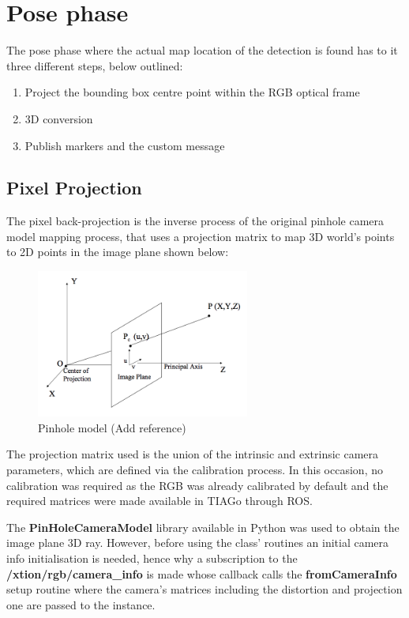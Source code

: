\section{Pose phase}

The pose phase where the actual map location of the detection is found has to it three different steps, below outlined:

\begin{enumerate}
  \item Project the bounding box centre point within the RGB optical frame
  \item 3D conversion 
  \item Publish markers and the custom message
\end{enumerate}

\subsection{Pixel Projection}

The pixel back-projection is the inverse process of the original pinhole camera model mapping process, that uses a projection matrix to map 3D world's points to 2D points in the image plane shown below:

\begin{figure}[!htbp]
\begin{center}
\includegraphics[width=7cm]{images/chapter4_pinhole_model.png}
\end{center}
\caption{Pinhole model (Add reference)}
\label{fig:pinhole}
\end{figure}

The projection matrix used is the union of the intrinsic and extrinsic camera parameters, which are defined via the calibration process. In this occasion, no calibration was required as the RGB was already calibrated by default and the required matrices were made available in TIAGo through ROS.

The \textbf{PinHoleCameraModel} library available in Python was used to obtain the image plane 3D ray. However, before using the class' routines an initial camera info initialisation is needed, hence why a subscription to the \textbf{/xtion/rgb/camera\_info} is made whose callback calls the \textbf{fromCameraInfo} setup routine where the camera's matrices including the distortion and projection one are passed to the instance.

